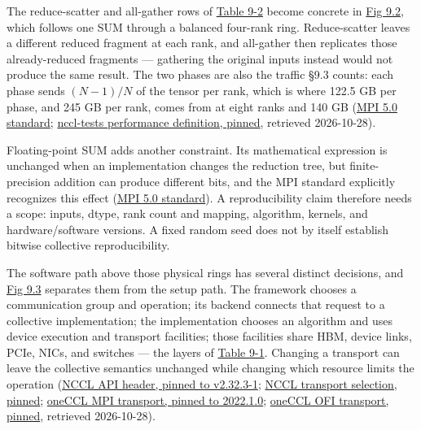The reduce-scatter and all-gather rows of \hyperref[tab:9.2]{Table 9-2} become concrete in
\hyperref[fig:9.2]{Fig 9.2}, which follows one SUM through a balanced four-rank ring.
Reduce-scatter leaves a different reduced fragment at each rank, and
all-gather then replicates those already-reduced fragments --- gathering
the original inputs instead would not produce the same result. The two
phases are also the traffic §9.3 counts: each phase sends \((N-1)/N\) of
the tensor per rank, which is where 122.5 GB per phase, and 245 GB per
rank, comes from at eight ranks and 140 GB
(\href{https://www.mpi-forum.org/docs/mpi-5.0/mpi50-report.pdf}{MPI 5.0
standard};
\href{https://raw.githubusercontent.com/NVIDIA/nccl-tests/afd59abab774a6a4b492eb344bd0c845a0b7bb4d/doc/PERFORMANCE.md}{nccl-tests
performance definition, pinned}, retrieved 2026-10-28).

Floating-point SUM adds another constraint. Its mathematical expression
is unchanged when an implementation changes the reduction tree, but
finite-precision addition can produce different bits, and the MPI
standard explicitly recognizes this effect
(\href{https://www.mpi-forum.org/docs/mpi-5.0/mpi50-report.pdf}{MPI 5.0
standard}). A reproducibility claim therefore needs a scope: inputs,
dtype, rank count and mapping, algorithm, kernels, and hardware/software
versions. A fixed random seed does not by itself establish bitwise
collective reproducibility.

The software path above those physical rings has several distinct
decisions, and \hyperref[fig:9.3]{Fig 9.3} separates them from the setup path. The framework
chooses a communication group and operation; its backend connects that
request to a collective implementation; the implementation chooses an
algorithm and uses device execution and transport facilities; those
facilities share HBM, device links, PCIe, NICs, and switches --- the
layers of \hyperref[tab:9.1]{Table 9-1}. Changing a transport can leave the collective
semantics unchanged while changing which resource limits the operation
(\href{https://raw.githubusercontent.com/NVIDIA/nccl/v2.32.3-1/src/nccl.h.in}{NCCL
API header, pinned to v2.32.3-1};
\href{https://raw.githubusercontent.com/NVIDIA/nccl/v2.32.3-1/src/transport.cc}{NCCL
transport selection, pinned};
\href{https://raw.githubusercontent.com/uxlfoundation/oneCCL/2022.1.0/deps/libccl/src/atl/mpi/atl_mpi.cpp}{oneCCL
MPI transport, pinned to 2022.1.0};
\href{https://raw.githubusercontent.com/uxlfoundation/oneCCL/2022.1.0/deps/libccl/src/atl/ofi/atl_ofi.cpp}{oneCCL
OFI transport, pinned}, retrieved 2026-10-28).

